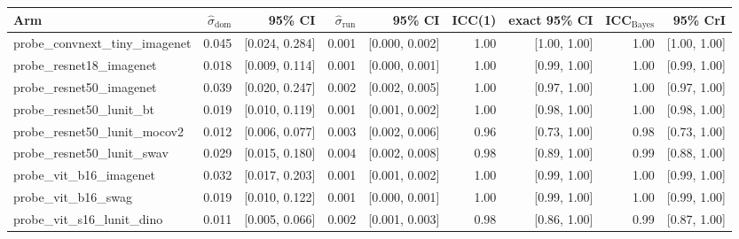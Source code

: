 \begin{tabular}{lrrrrrrrr}
\toprule
Arm & $\hat\sigma_\text{dom}$ & 95\% CI & $\hat\sigma_\text{run}$ & 95\% CI & ICC(1) & exact 95\% CI & ICC$_\text{Bayes}$ & 95\% CrI \\
\midrule
probe\_convnext\_tiny\_imagenet & 0.045 & [0.024, 0.284] & 0.001 & [0.000, 0.002] & 1.00 & [1.00, 1.00] & 1.00 & [1.00, 1.00] \\
probe\_resnet18\_imagenet & 0.018 & [0.009, 0.114] & 0.001 & [0.000, 0.001] & 1.00 & [0.99, 1.00] & 1.00 & [0.99, 1.00] \\
probe\_resnet50\_imagenet & 0.039 & [0.020, 0.247] & 0.002 & [0.002, 0.005] & 1.00 & [0.97, 1.00] & 1.00 & [0.97, 1.00] \\
probe\_resnet50\_lunit\_bt & 0.019 & [0.010, 0.119] & 0.001 & [0.001, 0.002] & 1.00 & [0.98, 1.00] & 1.00 & [0.98, 1.00] \\
probe\_resnet50\_lunit\_mocov2 & 0.012 & [0.006, 0.077] & 0.003 & [0.002, 0.006] & 0.96 & [0.73, 1.00] & 0.98 & [0.73, 1.00] \\
probe\_resnet50\_lunit\_swav & 0.029 & [0.015, 0.180] & 0.004 & [0.002, 0.008] & 0.98 & [0.89, 1.00] & 0.99 & [0.88, 1.00] \\
probe\_vit\_b16\_imagenet & 0.032 & [0.017, 0.203] & 0.001 & [0.001, 0.002] & 1.00 & [0.99, 1.00] & 1.00 & [0.99, 1.00] \\
probe\_vit\_b16\_swag & 0.019 & [0.010, 0.122] & 0.001 & [0.000, 0.001] & 1.00 & [0.99, 1.00] & 1.00 & [0.99, 1.00] \\
probe\_vit\_s16\_lunit\_dino & 0.011 & [0.005, 0.066] & 0.002 & [0.001, 0.003] & 0.98 & [0.86, 1.00] & 0.99 & [0.87, 1.00] \\
\bottomrule
\end{tabular}
